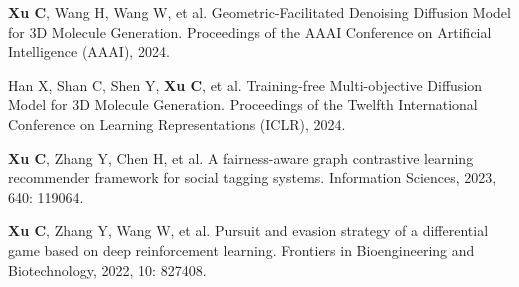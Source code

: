 
\begin{cventries}


\cvintro
{
    \begin{cvitems} %
        \item {\textcolor{awesome}{\textbf{Xu C}}, Wang H, Wang W, et al. Geometric-Facilitated Denoising Diffusion Model for 3D Molecule Generation. Proceedings of the AAAI Conference on Artificial Intelligence (AAAI), 2024.}
        \item {Han X, Shan C, Shen Y, \textcolor{awesome}{\textbf{Xu C}}, et al. Training-free Multi-objective Diffusion Model for 3D Molecule Generation. Proceedings of the Twelfth International Conference on Learning Representations (ICLR), 2024.}
        \item {\textcolor{awesome}{\textbf{Xu C}}, Zhang Y, Chen H, et al. A fairness-aware graph contrastive learning recommender framework for social tagging systems. Information Sciences, 2023, 640: 119064.}
        \item {\textcolor{awesome}{\textbf{Xu C}}, Zhang Y, Wang W, et al. Pursuit and evasion strategy of a differential game based on deep reinforcement learning. Frontiers in Bioengineering and Biotechnology, 2022, 10: 827408.}
    \end{cvitems}
}

\end{cventries}